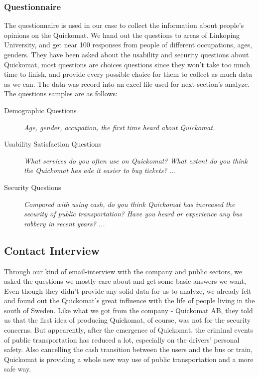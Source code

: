 \documentclass[twocolumn]{article}
\begin{document}
\subsubsection{Questionnaire}
The questionnaire is used in our case to collect the information about people’s opinions on the Quickomat. We hand out the questions to areas of Linkoping University, and get near 100 responses from people of different occupations, ages, genders. They have been asked about the usability and security questions about Quickomat, most questions are choices questions since they won’t take too much time to finish, and provide every possible choice for them to collect as much data as we can. The data was record into an excel file used for next section’s analyze. The questions samples are as follows:
\begin{description}
\item[Demographic Questions]
    \emph{Age, gender, occupation, the first time heard about Quickomat.}
\item[Usability Satisfaction Questions]
    \emph{What services do you often use on Quickomat?}
    \emph{What extent do you think the Quickomat has ade it easier to buy tickets?}
    \emph{...}
\item[Security Questions]
    \emph{Compared with using cash, do you think Quickomat has increased the security of public transportation?}
    \emph{Have you heard or experience any bus robbery in recent years?}
    \emph{...}
\end{description}

\subsection{Contact Interview}
Through our kind of email-interview with the company and public sectors, we asked the questions we mostly care about and get some basic answers we want, Even though they didn't provide any solid data for us to analyze, we already felt and found out the Quickomat's great influence with the life of people living in the south of Sweden.
Like what we got from the company - Quickomat AB, they told us that the first idea of producing Quickomat, of course, was not for the security concerns. But appearently, after the emergence of Quickomat, the criminal events of public transportation has reduced a lot, especially on the drivers' personal safety. Also cancelling the cash transition between the users and the bus or train, Quickomat is providing a whole new way use of public transportation and a more safe way.
\end{document}
